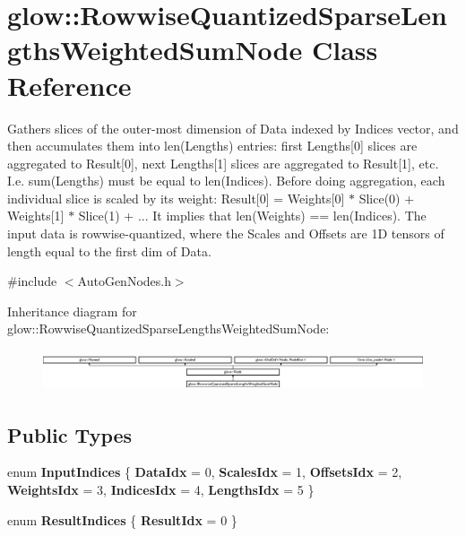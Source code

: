 \hypertarget{classglow_1_1_rowwise_quantized_sparse_lengths_weighted_sum_node}{}\section{glow\+:\+:Rowwise\+Quantized\+Sparse\+Lengths\+Weighted\+Sum\+Node Class Reference}
\label{classglow_1_1_rowwise_quantized_sparse_lengths_weighted_sum_node}


Gathers slices of the outer-\/most dimension of Data indexed by Indices vector, and then accumulates them into len(\+Lengths) entries\+: first Lengths\mbox{[}0\mbox{]} slices are aggregated to Result\mbox{[}0\mbox{]}, next Lengths\mbox{[}1\mbox{]} slices are aggregated to Result\mbox{[}1\mbox{]}, etc. I.\+e. sum(\+Lengths) must be equal to len(\+Indices). Before doing aggregation, each individual slice is scaled by its weight\+: Result\mbox{[}0\mbox{]} = Weights\mbox{[}0\mbox{]} $\ast$ Slice(0) + Weights\mbox{[}1\mbox{]} $\ast$ Slice(1) + ... It implies that len(\+Weights) == len(\+Indices). The input data is rowwise-\/quantized, where the Scales and Offsets are 1D tensors of length equal to the first dim of Data.  




{\ttfamily \#include $<$Auto\+Gen\+Nodes.\+h$>$}

Inheritance diagram for glow\+:\+:Rowwise\+Quantized\+Sparse\+Lengths\+Weighted\+Sum\+Node\+:\begin{figure}[H]
\begin{center}
\leavevmode
\includegraphics[height=1.206897cm]{classglow_1_1_rowwise_quantized_sparse_lengths_weighted_sum_node}
\end{center}
\end{figure}
\subsection*{Public Types}
\begin{DoxyCompactItemize}
\item 
\mbox{\label{classglow_1_1_rowwise_quantized_sparse_lengths_weighted_sum_node_ab2ff9046838b059dc7c75122004492c8}} 
enum {\bfseries Input\+Indices} \{ \newline
{\bfseries Data\+Idx} = 0, 
{\bfseries Scales\+Idx} = 1, 
{\bfseries Offsets\+Idx} = 2, 
{\bfseries Weights\+Idx} = 3, 
\newline
{\bfseries Indices\+Idx} = 4, 
{\bfseries Lengths\+Idx} = 5
 \}
\item 
\mbox{\label{classglow_1_1_rowwise_quantized_sparse_lengths_weighted_sum_node_a9862f4daf0614e7cbbb011524f3ea40c}} 
enum {\bfseries Result\+Indices} \{ {\bfseries Result\+Idx} = 0
 \}
\end{DoxyCompactItemize}
